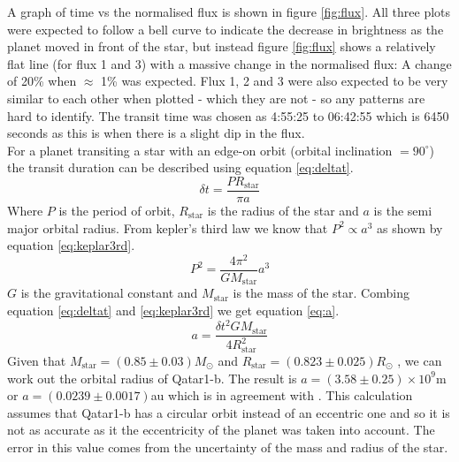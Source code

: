 \documentclass[10pt]{article}
\begin{document}
\noindent A graph of time vs the normalised flux is shown in figure \ref{fig:flux}. All three plots were expected to follow a bell curve to indicate the decrease in brightness as the planet moved in front of the star, but instead figure \ref{fig:flux} shows a relatively flat line (for flux 1 and 3) with a massive change in the normalised flux: A change of 20\% when $\approx$ 1\% was expected. Flux 1, 2 and 3 were also expected to be very similar to each other when plotted - which they are not - so any patterns are hard to identify. The transit time was chosen as 4:55:25 to 06:42:55 which is 6450 seconds as this is when there is a slight dip in the flux. \\
For a planet transiting a star with an edge-on orbit (orbital inclination $= 90^{\circ}$) the transit duration can be described using equation \ref{eq:deltat}.
\begin{equation}
	\delta t = \frac{P R_{\text{star}}}{\pi a}
	\label{eq:deltat}
\end{equation}
Where $P$ is the period of orbit, $R_{\text{star}}$ is the radius of the star and $a$ is the semi major orbital radius. From kepler's third law we know that $P^2 \propto a^3$ as shown by equation \ref{eq:keplar3rd}.
\begin{equation}
	P^2 = \frac{4 \pi ^2}{GM_{\text{star}}}a^3
	\label{eq:keplar3rd}
\end{equation}
$G$ is the gravitational constant and $M_{\text{star}}$ is the mass of the star. Combing equation \ref{eq:deltat} and \ref{eq:keplar3rd} we get equation \ref{eq:a}.
\begin{equation}
	a = \frac{\delta t ^2 G M_{\text{star}}}{4 R_{\text{star}}^2}
	\label{eq:a}
\end{equation}
Given that $M_{\text{star}} = (0.85 \pm 0.03)M_\odot$ and $R_{\text{star}} = (0.823 \pm 0.025)R_\odot$ \cite[p.5]{Alsubai_2011}, we can work out the orbital radius of Qatar1-b. The result is $a = (3.58 \pm 0.25) \times 10^9$m or $a = (0.0239 \pm 0.0017)$au which is in agreement with \cite{Alsubai_2011}. This calculation assumes that Qatar1-b has a circular orbit instead of an eccentric one and so it is not as accurate as it the eccentricity of the planet was taken into account. The error in this value comes from the uncertainty of the mass and radius of the star.
\end{document}
